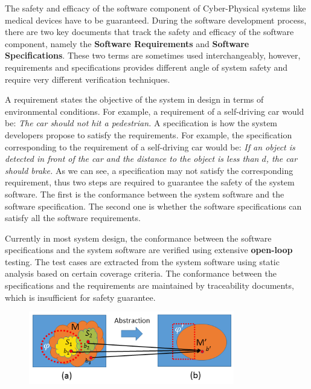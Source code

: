 \documentclass{llncs}
\begin{document}
The safety and efficacy of the software component of Cyber-Physical systems like medical devices have to be guaranteed. During the software development process, there are two key documents that track the safety and efficacy of the software component, namely the \textbf{Software Requirements} and \textbf{Software Specifications}. These two terms are sometimes used interchangeably, however, requirements and specifications provides different angle of system safety and require very different verification techniques.

A requirement states the objective of the system in design in terms of environmental conditions. For example, a requirement of a self-driving car would be: \emph{The car should not hit a pedestrian.} A specification is how the system developers propose to satisfy the requirements. For example, the specification corresponding to the requirement of a self-driving car would be: \emph{If an object is detected in front of the car and the distance to the object is less than $d$, the car should brake.} As we can see, a specification may not satisfy the corresponding requirement, thus two steps are required to guarantee the safety of the system software. The first is the conformance between the system software and the software specification. The second one is whether the software specifications can satisfy all the software requirements.

Currently in most system design, the conformance between the software specifications and the system software are verified using extensive \textbf{open-loop} testing. The test cases are extracted from the system software using static analysis based on certain coverage criteria. The conformance between the specifications and the requirements are maintained by traceability documents, which is insufficient for safety guarantee.
\begin{figure}[!t]
		\centering
		\includegraphics[width=0.8\textwidth]{figs/distinction.png}
		\caption{\small }
		\label{fig:distinction}
\end{figure}
\end{document}
